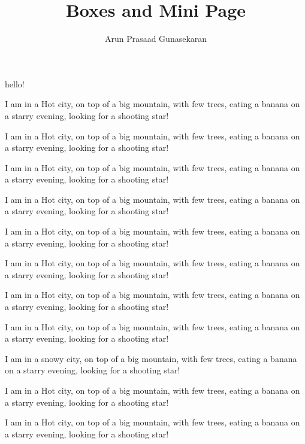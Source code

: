 \documentclass[10pt,a4paper]{article}
\author{Arun Prasaad Gunasekaran}
\title{Boxes and Mini Page}
\begin{document}
\maketitle
hello!

\begin{minipage}[t]{0.48\textwidth}
	I am in a Hot city, on top of a big mountain, with few trees, eating a banana on a starry evening, looking for a shooting star!
\end{minipage}
\hfill
\begin{minipage}[t]{0.4\textwidth}
	I am in a Hot city, on top of a big mountain, with few trees, eating a banana on a starry evening, looking for a shooting star!
\end{minipage}
\hfill
\begin{minipage}[t]{0.25\textwidth}
	I am in a Hot city, on top of a big mountain, with few trees, eating a banana on a starry evening, looking for a shooting star!
\end{minipage}
\hfill
\begin{minipage}[t]{0.25\textwidth}
	I am in a Hot city, on top of a big mountain, with few trees, eating a banana on a starry evening, looking for a shooting star!
\end{minipage}

\begin{minipage}[t]{0.25\textwidth}
	I am in a Hot city, on top of a big mountain, with few trees, eating a banana on a starry evening, looking for a shooting star!
\end{minipage}
\begin{minipage}[t]{0.25\textwidth}
	I am in a Hot city, on top of a big mountain, with few trees, eating a banana on a starry evening, looking for a shooting star!
\end{minipage}
\begin{minipage}[t]{0.25\textwidth}
	I am in a Hot city, on top of a big mountain, with few trees, eating a banana on a starry evening, looking for a shooting star!
\end{minipage}
\begin{minipage}[t]{0.25\textwidth}
	I am in a Hot city, on top of a big mountain, with few trees, eating a banana on a starry evening, looking for a shooting star!
\end{minipage}

\fbox
{
	\begin{minipage}[t]{0.33\textwidth}
	I am in a snowy city, on top of a big mountain, with few trees, eating a banana on a starry evening, looking for a shooting star!
	\end{minipage}
}

\fbox
{
\begin{minipage}[t]{0.33\textwidth}
	I am in a Hot city, on top of a big mountain, with few trees, eating a banana on a starry evening, looking for a shooting star!
\end{minipage}
}
\hfill
\fbox
{
\begin{minipage}[t]{0.33\textwidth}
	I am in a Hot city, on top of a big mountain, with few trees, eating a banana on a starry evening, looking for a shooting star!
\end{minipage}
}
\end{document}
